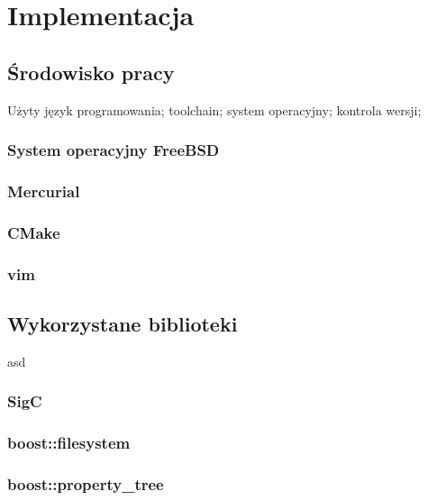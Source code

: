 \chapter{Implementacja}
\label{zxc}

\section{Środowisko pracy}
Użyty język programowania; toolchain; system operacyjny; kontrola wersji;
\subsection{System operacyjny FreeBSD}
\subsection{Mercurial}
\subsection{CMake}
\subsection{vim}

\section{Wykorzystane biblioteki}
asd
\subsection{SigC}

\subsection{boost::filesystem}

\subsection{boost::property\_tree}


